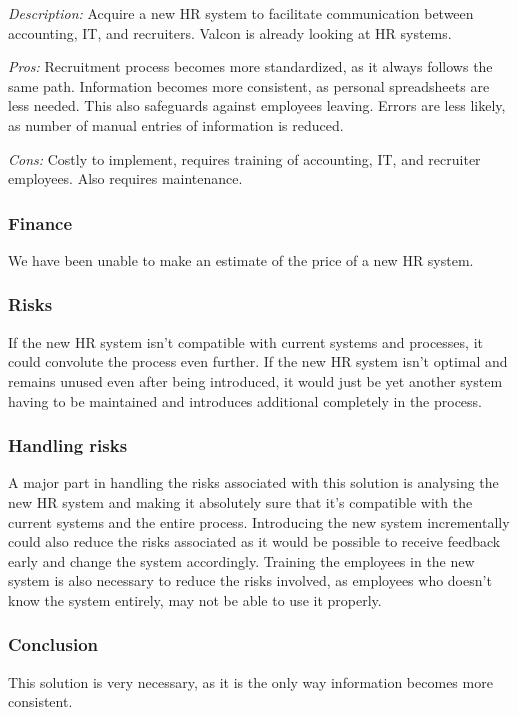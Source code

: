 \emph{Description:} Acquire a new HR system to facilitate communication between accounting, IT, and recruiters.
Valcon is already looking at HR systems.

\emph{Pros:} Recruitment process becomes more standardized, as it always follows the same path.
Information becomes more consistent, as personal spreadsheets are less needed. 
This also safeguards against employees leaving.
Errors are less likely, as number of manual entries of information is reduced.

\emph{Cons:} Costly to implement, requires training of accounting, IT, and recruiter employees.
Also requires maintenance.

\subsubsection{Finance}
We have been unable to make an estimate of the price of a new HR system.

\subsubsection{Risks}
If the new HR system isn't compatible with current systems and processes, it could convolute the process even further. 
If the new HR system isn't optimal and remains unused even after being introduced, it would just be yet another system having to be maintained and introduces additional completely in the process.

\subsubsection{Handling risks}
A major part in handling the risks associated with this solution is analysing the new HR system and making it absolutely sure that it's compatible with the current systems and the entire process. 
Introducing the new system incrementally could also reduce the risks associated as it would be possible to receive feedback early and change the system accordingly. 
Training the employees in the new system is also necessary to reduce the risks involved, as employees who doesn't know the system entirely, may not be able to use it properly.

\subsubsection{Conclusion} 
This solution is very necessary, as it is the only way information becomes more consistent.
